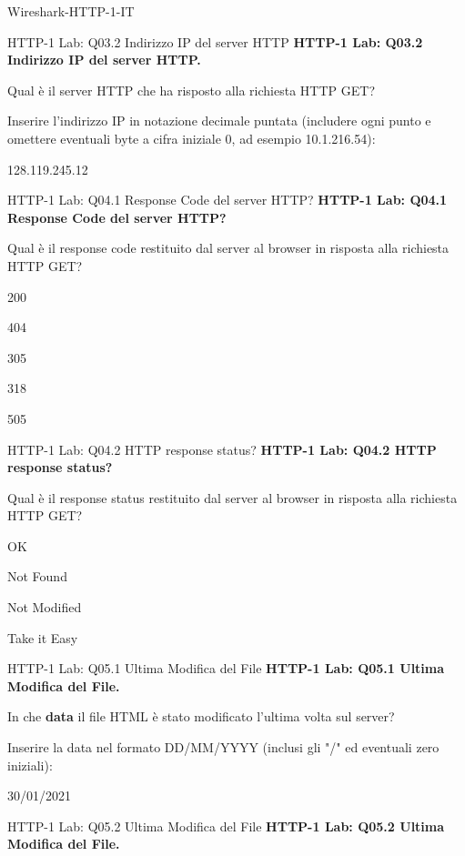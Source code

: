\documentclass[a4paper]{article}
\begin{document}
\begin{quiz}{Wireshark-HTTP-1-IT}
\begin{shortanswer}[points=1]{HTTP-1 Lab: Q03.2 Indirizzo IP del server HTTP}
\textbf{HTTP-1 Lab: Q03.2 Indirizzo IP del server HTTP.} 

Qual è il server HTTP che ha risposto alla richiesta HTTP GET? 

Inserire l'indirizzo IP in notazione decimale puntata (includere ogni punto e omettere eventuali byte a cifra iniziale 0, ad esempio 10.1.216.54): 
\item 128.119.245.12 
\end{shortanswer}

\begin{multi}[points=1,shuffle]{HTTP-1 Lab: Q04.1 Response Code del server HTTP?}
\textbf{HTTP-1 Lab: Q04.1 Response Code del server HTTP?} 

Qual è il response code restituito dal server al browser in risposta alla richiesta HTTP GET? 
\item* 200
\item 404
\item 305
\item 318
\item 505
\end{multi}

\begin{multi}[points=1,shuffle]{HTTP-1 Lab: Q04.2 HTTP response status?}
\textbf{HTTP-1 Lab: Q04.2 HTTP response status?} 

Qual è il response status restituito dal server al browser in risposta alla richiesta HTTP GET?
\item* OK
\item Not Found
\item Not Modified
\item Take it Easy
\end{multi}

\begin{shortanswer}[points=1]{HTTP-1 Lab: Q05.1 Ultima Modifica del File}
\textbf{HTTP-1 Lab: Q05.1 Ultima Modifica del File.} 

In che \textbf{data} il file HTML è stato modificato l'ultima volta sul server? 

Inserire la data nel formato DD/MM/YYYY (inclusi gli "/" ed eventuali zero iniziali):
\item 30/01/2021
\end{shortanswer}

\begin{shortanswer}[points=1]{HTTP-1 Lab: Q05.2 Ultima Modifica del File}
\textbf{HTTP-1 Lab: Q05.2 Ultima Modifica del File.} 


\end{shortanswer}
\end{quiz}
\end{document}
